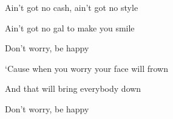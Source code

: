 \begin{song}
\bigskip

\Chorus

\bigskip

 Ain't got no cash, ain't got no style \par
{}Ain't got no gal to make you smile \par
Don't worry, be happy \par

\bigskip

‘Cause when you worry your face will frown \par
And that will bring everybody down \par
Don't worry, be happy  \par

\bigskip

\Chorus

\end{song}
